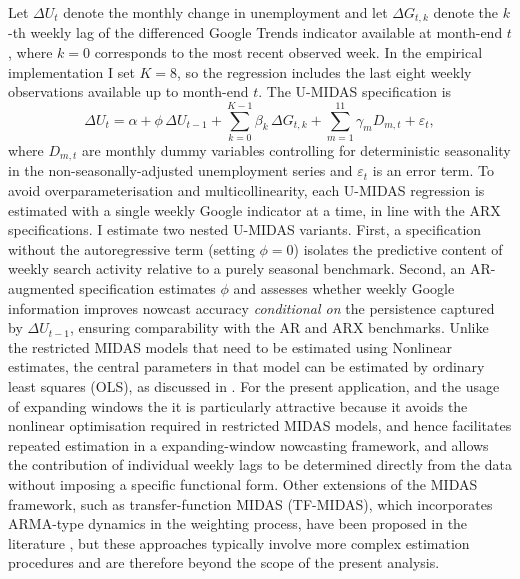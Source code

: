 \documentclass[12pt,a4paper]{article}
\begin{document}
Let $\Delta U_t$ denote the monthly change in unemployment and let $\Delta G_{t,k}$ denote the $k$-th weekly lag of the differenced Google Trends indicator available at month-end $t$, where $k=0$ corresponds to the most recent observed week. In the empirical implementation I set $K=8$, so the regression includes the last eight weekly observations available up to month-end $t$. The U-MIDAS specification is
\begin{equation}
    \Delta U_t 
    = \alpha
    + \phi \,\Delta U_{t-1}
    + \sum_{k=0}^{K-1} \beta_{k}\,\Delta G_{t,k}
    + \sum_{m=1}^{11} \gamma_m D_{m,t}
    + \varepsilon_t,
    \label{eq:umidas}
\end{equation}
where $D_{m,t}$ are monthly dummy variables controlling for deterministic seasonality in the non-seasonally-adjusted unemployment series and $\varepsilon_t$ is an error term. To avoid overparameterisation and multicollinearity, each U-MIDAS regression is estimated with a single weekly Google indicator at a time, in line with the ARX specifications.
I estimate two nested U-MIDAS variants. First, a specification without the autoregressive term (setting $\phi=0$) isolates the predictive content of weekly search activity relative to a purely seasonal benchmark. Second, an AR-augmented specification estimates $\phi$ and assesses whether weekly Google information improves nowcast accuracy \emph{conditional on} the persistence captured by $\Delta U_{t-1}$, ensuring comparability with the AR and ARX benchmarks.
 Unlike the restricted MIDAS models that need to be estimated using Nonlinear estimates, the central parameters in that model can be estimated by ordinary least squares (OLS), as 
discussed in \citet{foroni2015unrestricted}. For the present application, and the usage of expanding windows the it is
particularly attractive because it avoids the nonlinear optimisation required in 
restricted MIDAS models, and hence facilitates repeated estimation in a expanding-window 
nowcasting framework, and allows the contribution of individual weekly lags to be 
determined directly from the data without imposing a specific functional form.
Other extensions of the MIDAS framework, such as transfer-function MIDAS (TF-MIDAS), which incorporates ARMA-type dynamics in the weighting process, have been proposed in the literature \citep{gayoso}, but these approaches typically involve more complex estimation procedures and are therefore beyond the scope of the present analysis.
\end{document}
